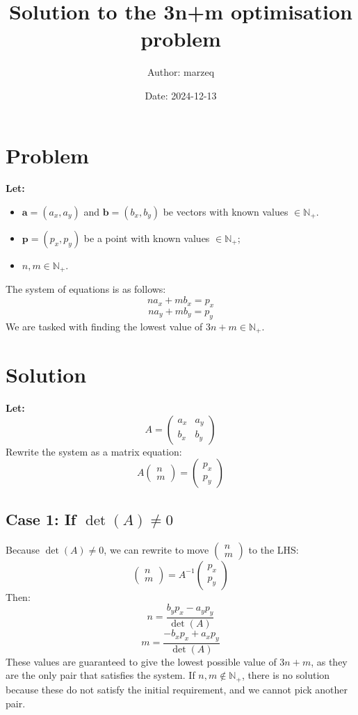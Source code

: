 \documentclass{article}
\title{Solution to the 3n+m optimisation problem}
\author{Author: marzeq}
\date{Date: 2024-12-13}
\begin{document}
\maketitle

\section*{Problem}

\textbf{Let:}
\begin{itemize}
  \item \( \mathbf{a} = (a_x, a_y) \) and \( \mathbf{b} = (b_x, b_y) \) be vectors with known values \( \in \mathbb{N_+} \).
  \item \( \mathbf{p} = (p_x, p_y) \) be a point with known values \( \in \mathbb{N_+} \);
  \item \( n,m \in \mathbb{N_+} \).
\end{itemize}
The system of equations is as follows:
\[
na_x + mb_x = p_x
\]
\[
na_y + mb_y = p_y
\]
We are tasked with finding the lowest value of \( 3n+m \in \mathbb{N_+} \).

\section*{Solution}

\textbf{Let:}
\[
A = \begin{pmatrix}
a_x & a_y \\
b_x & b_y
\end{pmatrix}
\]
Rewrite the system as a matrix equation:
\[
A \begin{pmatrix}
n \\
m
\end{pmatrix}
= \begin{pmatrix}
p_x \\
p_y
\end{pmatrix}
\]

\subsection*{Case 1: If \( \det(A) \neq 0 \)}

Because \( \det(A) \neq 0 \), we can rewrite to move \(\begin{pmatrix}n\\ m\end{pmatrix}\) to the LHS:
\[
\begin{pmatrix}
n \\
m
\end{pmatrix}
= A^{-1} \begin{pmatrix}
p_x \\
p_y
\end{pmatrix}
\]
Then:
\[
n = \frac{b_yp_x - a_yp_y}{\det(A)}
\]
\[
m = \frac{-b_xp_x + a_xp_y}{\det(A)}
\]
These values are guaranteed to give the lowest possible value of \( 3n+m \), as they are the only pair that satisfies the system.
If \( n,m \notin \mathbb{N_+} \), there is no solution because these do not satisfy the initial requirement, and we cannot pick another pair.
\end{document}
